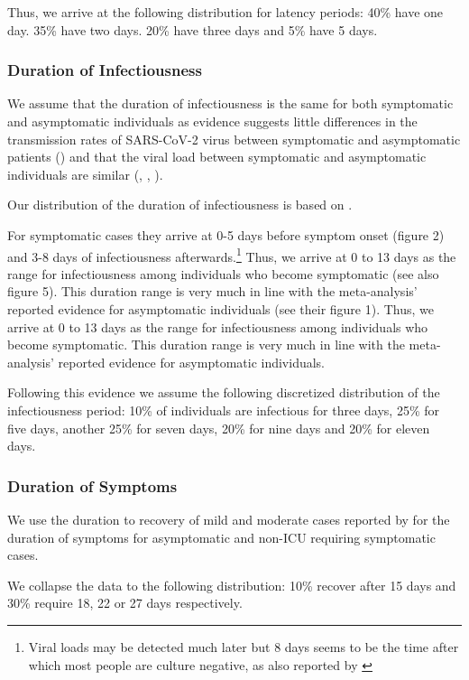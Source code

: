Thus, we arrive at the following distribution for latency periods: 40\% have one day.
35\% have two days. 20\% have three days and 5\% have 5 days.


\subsubsection{Duration of Infectiousness}

We assume that the duration of infectiousness is the same for both symptomatic and
asymptomatic individuals as evidence suggests little differences in the transmission
rates of SARS-CoV-2 virus between symptomatic and asymptomatic patients
(\citet{Yin2020}) and that the viral load between symptomatic and asymptomatic
individuals are similar (\citet{Zou2020}, \citet{Byrne2020}, \citet{Singanayagam2020}).

Our distribution of the duration of infectiousness is based on \citet{Byrne2020}.

For symptomatic cases they arrive at 0-5 days before symptom onset (figure 2) and 3-8
days of infectiousness afterwards.\footnote{Viral loads may be detected much later but 8
days seems to be the time after which most people are culture negative, as also reported
by \citet{Singanayagam2020}} Thus, we arrive at 0 to 13 days as the range for
infectiousness among individuals who become symptomatic (see also figure 5). This
duration range is very much in line with the meta-analysis’ reported evidence for
asymptomatic individuals (see their figure 1). Thus, we arrive at 0 to 13 days as the
range for infectiousness among individuals who become symptomatic. This duration range
is very much in line with the meta-analysis' reported evidence for asymptomatic
individuals.

Following this evidence we assume the following discretized distribution of the
infectiousness period: 10\% of individuals are infectious for three days, 25\% for five
days, another 25\% for seven days, 20\% for nine days and 20\% for eleven days.


\subsubsection{Duration of Symptoms}

We use the duration to recovery of mild and moderate cases reported by \cite[Figure~S3,
Panel~2]{Bi2020} for the duration of symptoms for asymptomatic and non-ICU requiring
symptomatic cases.

We collapse the data to the following distribution: 10\% recover after 15 days and 30\%
require 18, 22 or 27 days respectively.

